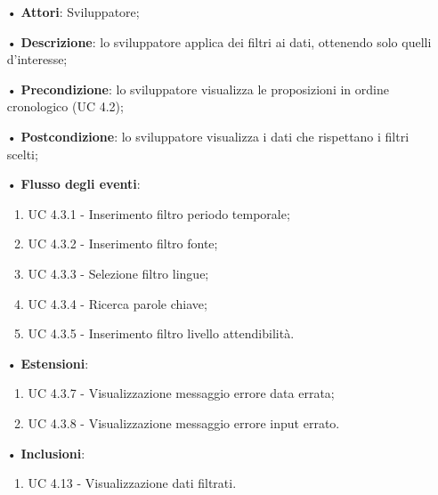 \begin{itemize}
	\item[•]\textbf{Attori}: Sviluppatore;
	\item[•]\textbf{Descrizione}: lo sviluppatore applica dei filtri ai dati, ottenendo solo quelli d'interesse;
	\item[•]\textbf{Precondizione}: lo sviluppatore visualizza le proposizioni in ordine cronologico (UC 4.2);
	\item[•]\textbf{Postcondizione}: lo sviluppatore visualizza i dati che rispettano i filtri scelti;
	\item[•]\textbf{Flusso degli eventi}:
	\begin{enumerate}
		\item UC 4.3.1 - Inserimento filtro periodo temporale;
		\item UC 4.3.2 - Inserimento filtro {fonte};
		\item UC 4.3.3 - Selezione filtro lingue;
		\item UC 4.3.4 - Ricerca parole chiave;
		\item UC 4.3.5 - Inserimento filtro livello attendibilità.
	\end{enumerate}
	\item[•]\textbf{Estensioni}:
	\begin{enumerate}
		\item UC 4.3.7 - Visualizzazione messaggio errore data errata;
		\item UC 4.3.8 - Visualizzazione messaggio errore input errato.
	\end{enumerate}
	\item[•]\textbf{Inclusioni}:
	\begin{enumerate}
		\item UC 4.13 - Visualizzazione dati filtrati.
	\end{enumerate}
\end{itemize}
